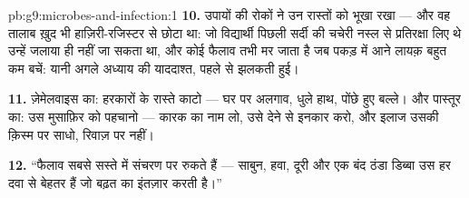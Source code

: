 \begin{solution}{pb:g9:microbes-and-infection:1}
\textbf{10.} उपायों की रोकों ने उन रास्तों को भूखा रखा --- और वह तालाब
ख़ुद भी हाज़िरी-रजिस्टर से छोटा था: जो विद्यार्थी पिछली सर्दी की चचेरी
नस्ल से प्रतिरक्षा लिए थे उन्हें जलाया ही नहीं जा सकता था, और कोई फैलाव
तभी मर जाता है जब पकड़ में आने लायक़ बहुत कम बचें: यानी अगले अध्याय की
याददाश्त, पहले से झलकती हुई।

\textbf{11.} ज़ेमेलवाइस का: हरकारों के रास्ते काटो --- घर पर अलगाव, धुले
हाथ, पोंछे हुए बल्ले। और पास्तूर का: उस मुसाफ़िर को पहचानो --- कारक का
नाम लो, उसे  देने से इनकार करो, और इलाज उसकी क़िस्म पर साधो,
रिवाज़ पर नहीं।

\textbf{12.} ``फैलाव सबसे सस्ते में संचरण पर रुकते हैं --- साबुन, हवा,
दूरी और एक बंद ठंडा डिब्बा उस हर दवा से बेहतर हैं जो बढ़त का इंतज़ार करती
है।''
\end{solution}
